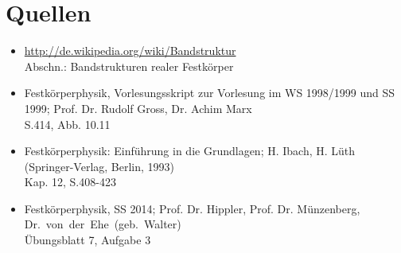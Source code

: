 \documentclass[numbers=noenddot,14pt,a4paper]{scrartcl}
\begin{document}
\section{Quellen}
\begin{itemize}
	\item{\url{http://de.wikipedia.org/wiki/Bandstruktur}\\ Abschn.: Bandstrukturen realer Festkörper}
	\item{Festkörperphysik, Vorlesungsskript zur Vorlesung im WS 1998/1999 und SS 1999; Prof. Dr. Rudolf Gross, Dr. Achim Marx\\
		S.414, Abb. 10.11}
	\item{Festkörperphysik: Einführung in die Grundlagen; H. Ibach, H. Lüth\\
	(Springer-Verlag, Berlin, 1993)\\
		Kap. 12, S.408-423}
	\item{Festkörperphysik, SS 2014; Prof. Dr. Hippler, Prof. Dr. Münzenberg,\\ \mbox{Dr. von der Ehe (geb. Walter)}\\
		Übungsblatt 7, Aufgabe 3}
\end{itemize}
\end{document}

